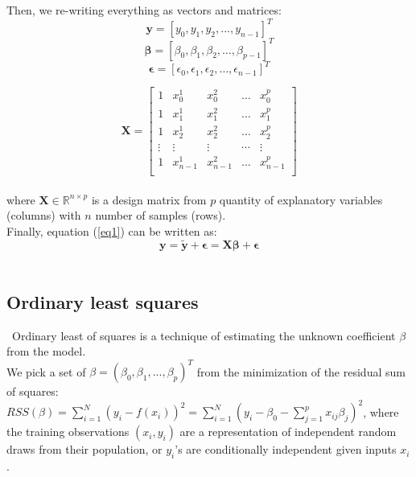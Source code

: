 Then, we re-writing everything as vectors and matrices:\\

$$\textbf{y} = [y_0,y_1, y_2,..., y_{n-1}]^T$$
$$\boldsymbol{\beta} = [\beta_0,\beta_1, \beta_2,\dots, \beta_{p-1}]^T$$
$$\boldsymbol{\epsilon} = [\epsilon_0,\epsilon_1, \epsilon_2,\dots, \epsilon_{n-1}]^T$$

$$\boldsymbol{X}=
\begin{bmatrix} 
1& x_{0}^1 &x_{0}^2& \dots &x_{0}^{p} \\
1& x_{1}^1 &x_{1}^2& \dots &x_{1}^{p} \\
1& x_{2}^1 &x_{2}^2& \dots &x_{2}^{p} \\                      
\vdots& \vdots &\vdots& \cdots &\vdots \\
1& x_{n-1}^1 &x_{n-1}^2& \dots &x_{n-1}^{p} \\
\end{bmatrix}$$ \\

\noindent where $\textbf{X} \in \mathbb{R}^{n \times p}$ is a design matrix from $p$ quantity of explanatory variables (columns) with $n$ number of samples (rows). \\

Finally, equation (\ref{eq1}) can be written as:\\

\begin{equation}
\label{eq2}
\boldsymbol{y} = \boldsymbol{\tilde{y}} + \boldsymbol{\epsilon} = \boldsymbol{X\beta} + \boldsymbol{\epsilon}
\end{equation}\\

\subsection{Ordinary least squares}
\label{chap:Ordinary least squares}

\qquad \, Ordinary least of squares is a technique of estimating the unknown coefficient $\beta$ from the model.\\

We pick a set of $\beta=(\beta_0, \beta_1, ..., \beta_p)^T$ from the minimization of the residual sum of squares: $RSS(\beta)=\sum^N_{i=1}(y_i-f(x_i))^2=\sum^N_{i=1}(y_i-\beta_0-\sum^p_{j=1}x_{ij}\beta_j)^2$, where the training observations $(x_i, y_i)$ are a representation of independent random draws from their population, or $y_i$'s are conditionally independent given inputs $x_i$. \\

